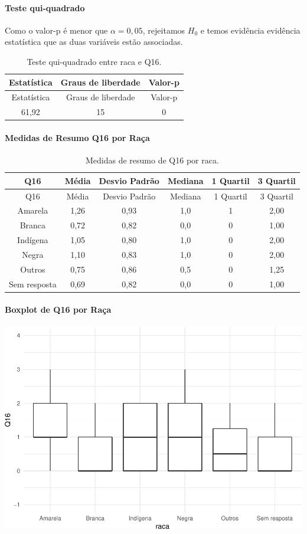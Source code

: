 \documentclass[]{article}
\let\oldparagraph\paragraph
\renewcommand{\paragraph}[1]{\oldparagraph{#1}\mbox{}}
\begin{document}
\hypertarget{teste-qui-quadrado-16}{%
\paragraph{Teste qui-quadrado}\label{teste-qui-quadrado-16}}

Como o valor-p é menor que \(\alpha=0,05\), rejeitamos \(H_0\) e temos evidência evidência estatística que as duas variáveis estão associadas.

\begin{longtable}[]{@{}ccc@{}}
\caption{\label{tab:unnamed-chunk-166}Teste qui-quadrado entre raca e Q16.}\tabularnewline
\toprule
Estatística & Graus de liberdade & Valor-p\tabularnewline
\midrule
\endfirsthead
\toprule
Estatística & Graus de liberdade & Valor-p\tabularnewline
\midrule
\endhead
61,92 & 15 & 0\tabularnewline
\bottomrule
\end{longtable}

\cleardoublepage

\hypertarget{medidas-de-resumo-q16-por-rauxe7a-1}{%
\paragraph{Medidas de Resumo Q16 por Raça}\label{medidas-de-resumo-q16-por-rauxe7a-1}}

\begin{longtable}[]{@{}cccccc@{}}
\caption{\label{tab:unnamed-chunk-167}Medidas de resumo de Q16 por raca.}\tabularnewline
\toprule
Q16 & Média & Desvio Padrão & Mediana & 1 Quartil & 3 Quartil\tabularnewline
\midrule
\endfirsthead
\toprule
Q16 & Média & Desvio Padrão & Mediana & 1 Quartil & 3 Quartil\tabularnewline
\midrule
\endhead
Amarela & 1,26 & 0,93 & 1,0 & 1 & 2,00\tabularnewline
Branca & 0,72 & 0,82 & 0,0 & 0 & 1,00\tabularnewline
Indígena & 1,05 & 0,80 & 1,0 & 0 & 2,00\tabularnewline
Negra & 1,10 & 0,83 & 1,0 & 0 & 2,00\tabularnewline
Outros & 0,75 & 0,86 & 0,5 & 0 & 1,25\tabularnewline
Sem resposta & 0,69 & 0,82 & 0,0 & 0 & 1,00\tabularnewline
\bottomrule
\end{longtable}

\hypertarget{boxplot-de-q16-por-rauxe7a-1}{%
\paragraph{Boxplot de Q16 por Raça}\label{boxplot-de-q16-por-rauxe7a-1}}

\begin{center}\includegraphics[width=0.75\linewidth]{relatorio_files/figure-latex/unnamed-chunk-168-1} \end{center}
\end{document}

